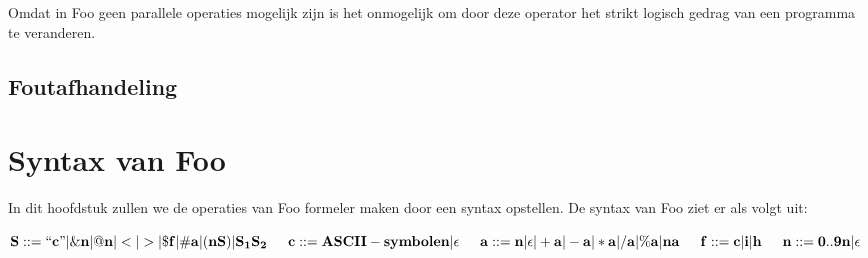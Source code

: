 \documentclass[11pt]{article}
\begin{document}
Omdat in Foo geen parallele operaties mogelijk zijn is het onmogelijk om door deze operator het strikt logisch gedrag van een programma te veranderen.

\subsection{Foutafhandeling}

\section{Syntax van Foo}
In dit hoofdstuk zullen we de operaties van Foo formeler maken door een syntax opstellen. 
De syntax van Foo ziet er als volgt uit:
\newline

\begin{math}
{\bf S::= ``c" | \&n | @n | < | > | \$f | \#a | (nS) | S_{1}S_{2} }
\newline
\newline
\indent{\bf c::= ASCII-symbolen| \epsilon}
\newline
\indent{\bf a::= n | \epsilon | +a | -a | *a | /a | \%a | na}
\newline 
\indent{\bf f::= c | i | h}
\newline
\indent{\bf n::= 0..9n | \epsilon}
\end{math}
\end{document}
